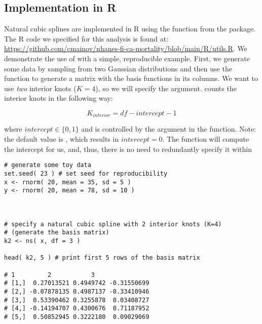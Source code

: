 \documentclass{article}
\begin{document}
\subsection{Implementation in R} %
\hspace{\parindent} Natural cubic splines are implemented in R using the {} function from the {} package. The R code we specified for this analysis is found at: \textcolor{blue}{\url{https://github.com/cmainov/nhanes-fi-ca-mortality/blob/main/R/utils.R}}. We demonstrate the use of {} with a simple, reproducible example. First, we generate some data by sampling from two Gaussian distributions and then use the {} function to generate a matrix with the basis functions in its columns. We want to use \textit{two} interior knots ($K=4$), so we will specify the {} argument.  {} counts the interior knots in the following way:

$$K_{interior}=df-intercept-1$$

\noindent where $intercept \in \{0,1\}$ and is controlled by the {} argument in the {} function. Note: the default value is {}, which results in $intercept=0$. The {} function will compute the intercept for us, and, thus, there is no need to redundantly specify it within {} 
 
 \vspace{0.7cm}
 
\begin{lstlisting}
# generate some toy data
set.seed( 23 ) # set seed for reproducibility 
x <- rnorm( 20, mean = 35, sd = 5 )
y <- rnorm( 20, mean = 78, sd = 10 )



# specify a natural cubic spline with 2 interior knots (K=4)
# (generate the basis matrix)
k2 <- ns( x, df = 3 )

head( k2, 5 ) # print first 5 rows of the basis matrix

# 1         2           3
# [1,]  0.27013521 0.4949742 -0.31550699
# [2,] -0.07878135 0.4987137 -0.33410946
# [3,]  0.53390462 0.3255878  0.03408727
# [4,] -0.14194707 0.4300676  0.71187952
# [5,]  0.50852945 0.3222180  0.09029069

\end{lstlisting}

 \vspace{0.5cm}
 
\end{document}
